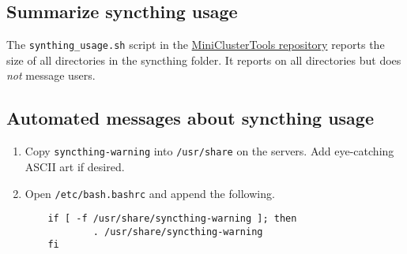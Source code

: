 \subsection{Summarize syncthing usage} \label{subsec:syncsize}

The \texttt{synthing\_usage.sh} script in the \href{https://github.com/coyleej/MiniClusterTools}{MiniClusterTools repository} reports the size of all directories in the syncthing folder. It reports on all directories but does \emph{not} message users.  

\subsection{Automated messages about syncthing usage} \label{subsec:syncautomessage}

\begin{enumerate}
  \item Copy \texttt{syncthing-warning} into \texttt{/usr/share} on the servers. Add eye-catching ASCII art if desired.

  \item Open \texttt{/etc/bash.bashrc} and append the following.

	\begin{verbatim}
	if [ -f /usr/share/syncthing-warning ]; then
	        . /usr/share/syncthing-warning
	fi
	\end{verbatim}
\end{enumerate}
